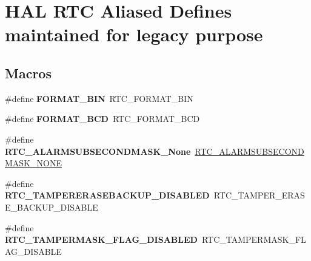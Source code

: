 \hypertarget{group___h_a_l___r_t_c___aliased___defines}{}\section{H\+AL R\+TC Aliased Defines maintained for legacy purpose}
\label{group___h_a_l___r_t_c___aliased___defines}
\subsection*{Macros}
\begin{DoxyCompactItemize}
\item 
\mbox{\label{group___h_a_l___r_t_c___aliased___defines_ga1adf0882a1368a3cef0edc34dcf8d34e}} 
\#define {\bfseries F\+O\+R\+M\+A\+T\+\_\+\+B\+IN}~R\+T\+C\+\_\+\+F\+O\+R\+M\+A\+T\+\_\+\+B\+IN
\item 
\mbox{\label{group___h_a_l___r_t_c___aliased___defines_ga950fc88b539cc9a8cf66aab2ee860fe1}} 
\#define {\bfseries F\+O\+R\+M\+A\+T\+\_\+\+B\+CD}~R\+T\+C\+\_\+\+F\+O\+R\+M\+A\+T\+\_\+\+B\+CD
\item 
\mbox{\label{group___h_a_l___r_t_c___aliased___defines_ga242adf20d2422fd1ae7715b8acd82623}} 
\#define {\bfseries R\+T\+C\+\_\+\+A\+L\+A\+R\+M\+S\+U\+B\+S\+E\+C\+O\+N\+D\+M\+A\+S\+K\+\_\+\+None}~\hyperlink{group___r_t_c___alarm___sub___seconds___masks___definitions_ga2c3802d48626766a3fc85ad910caea02}{R\+T\+C\+\_\+\+A\+L\+A\+R\+M\+S\+U\+B\+S\+E\+C\+O\+N\+D\+M\+A\+S\+K\+\_\+\+N\+O\+NE}
\item 
\mbox{\label{group___h_a_l___r_t_c___aliased___defines_ga55d9466b1ec35bce5df17af28e142014}} 
\#define {\bfseries R\+T\+C\+\_\+\+T\+A\+M\+P\+E\+R\+E\+R\+A\+S\+E\+B\+A\+C\+K\+U\+P\+\_\+\+D\+I\+S\+A\+B\+L\+ED}~R\+T\+C\+\_\+\+T\+A\+M\+P\+E\+R\+\_\+\+E\+R\+A\+S\+E\+\_\+\+B\+A\+C\+K\+U\+P\+\_\+\+D\+I\+S\+A\+B\+LE
\item 
\mbox{\label{group___h_a_l___r_t_c___aliased___defines_gad032982f8c14ffd4864df3ebfee45f70}} 
\#define {\bfseries R\+T\+C\+\_\+\+T\+A\+M\+P\+E\+R\+M\+A\+S\+K\+\_\+\+F\+L\+A\+G\+\_\+\+D\+I\+S\+A\+B\+L\+ED}~R\+T\+C\+\_\+\+T\+A\+M\+P\+E\+R\+M\+A\+S\+K\+\_\+\+F\+L\+A\+G\+\_\+\+D\+I\+S\+A\+B\+LE

\end{DoxyCompactItemize}
